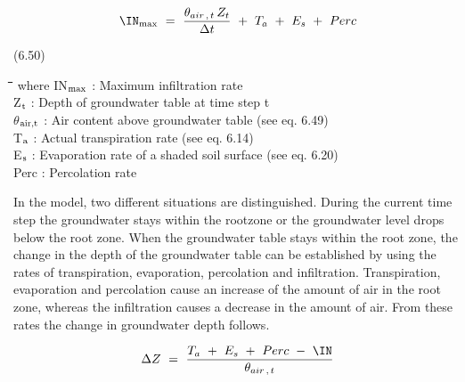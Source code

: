 \documentclass[11pt]{article}
\begin{document}
\begin{displaymath}
\IN _{\max } ~=~{\frac{\theta _{air\, ,\, t} \, Z _{t} }{\Delta t}} ~+~ T _{a} ~+~ E _{s} ~+~ Perc
\end{displaymath}

 \bigskip
\strut\hfill (6.50)

\nwln
\begin{tabbing}
\hspace{1.27cm}\=\hspace{1.27cm}\=\hspace{1.27cm}\=\hspace{1.27cm}\=%
\hspace{1.27cm}\=\hspace{1.27cm}\=\hspace{1.27cm}\=\hspace{1.27cm}\=%
\hspace{1.27cm}\=\hspace{1.27cm}\=\kill
where\> IN$_{{\rm max}}$\> : Maximum infiltration rate\> \> \> \> \> \> \> \> [cm d$^{{\rm -1}}$]\\
\>Z$_{{\rm t}}$\> : Depth of groundwater table at time step t\> \> \> \> \> \> \> \> [cm]\\
\>$\theta$$_{{\rm air,t}}$\> : Air content above groundwater table (see eq. 6.49)\> \> \> \> \> \> \> \> [cm$^{{\rm 3}}$ cm$^{{\rm -3}}$]\\
\>T$_{{\rm a}}$\> : Actual transpiration rate (see eq. 6.14)\> \> \> \> \> \> \> \> [cm d$^{{\rm -1}}$]\\
\>E$_{{\rm s}}$\> : Evaporation rate of a shaded soil surface (see eq. 6.20)\> \> \> \> \> \> \> \> [cm d$^{{\rm -1}}$]\\
\>Perc\> : Percolation rate\> \> \> \> \> \> \> \> [cm d$^{{\rm -1}}$]
\end{tabbing}

\bigskip
\bigskip
 In the model, two different situations are distinguished. During the current time step the
ground\-water stays within the rootzone or the groundwater level drops below the root
zone. When the groundwater table stays within the root zone, the change in the depth of
the groundwater table can be established by using the rates of transpiration, evaporation,
percolation and infiltration. Transpiration, evaporation and percolation cause an increase
of the amount of air in the root zone, whereas the infiltration causes a decrease in the
amount of air. From these rates the change in groundwater depth follows. 

\begin{displaymath}
\Delta Z ~=~{\frac{T _{a} ~+~ E _{s} ~+~ Perc ~-~ \IN }{\theta _{air\, ,\, t} }}
\end{displaymath}
\end{document}
